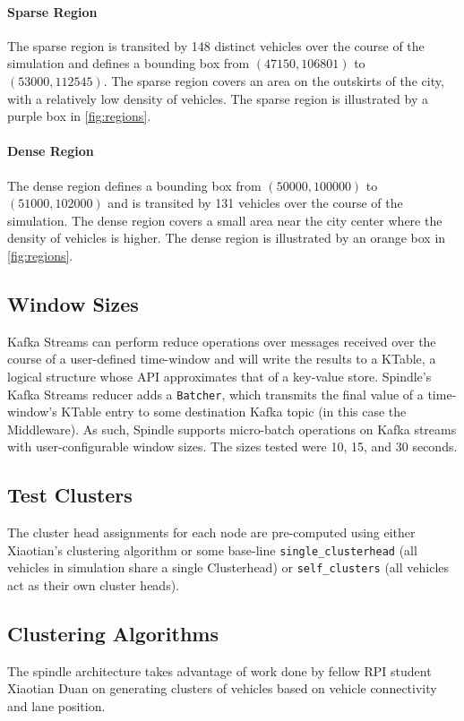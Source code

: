\documentclass{thesis}
\begin{document}
    \paragraph{Sparse Region}
        The sparse region is transited by 148 distinct vehicles over the course of the simulation and defines a bounding
        box from $(47150, 106801)$ to $(53000, 112545)$. The sparse region covers an area on the outskirts of the city,
        with a relatively low density of vehicles. The sparse region is illustrated by a purple box in \ref{fig:regions}.
    \paragraph{Dense Region}
        The dense region defines a bounding box from $(50000, 100000)$ to $(51000, 102000)$ and is transited by
        131 vehicles over the course of the simulation. The dense region covers a small area near the city center
        where the density of vehicles is higher. The dense region is illustrated by an orange box in \ref{fig:regions}.

\subsection{Window Sizes}
    Kafka Streams can perform reduce operations over messages received over the course of a user-defined time-window
    and will write the results to a KTable, a logical structure whose API approximates that of a key-value store. %
    Spindle's Kafka Streams reducer adds a \verb|Batcher|, which transmits the final value of a time-window's KTable
    entry to some destination Kafka topic (in this case the Middleware). As such, Spindle supports micro-batch operations
    on Kafka streams with user-configurable window sizes. The sizes tested were 10, 15, and 30 seconds.
\subsection{Test Clusters}
    The cluster head assignments for each node are pre-computed using either Xiaotian's %
    clustering algorithm or some base-line \verb|single_clusterhead| (all vehicles in simulation share a single Clusterhead)
    or \verb|self_clusters| (all vehicles act as their own cluster heads).
\subsection{Clustering Algorithms}
    The spindle architecture takes advantage of work done by fellow RPI student Xiaotian Duan on generating
    clusters of vehicles based on vehicle connectivity and lane position. 
\end{document}
